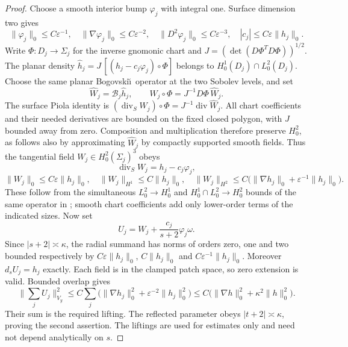 \documentclass[11pt,a4paper]{article}
\theoremstyle{remark}
\numberwithin{equation}{section}
\begin{document}
\begin{proof}
Choose a smooth interior bump $\varphi_j$ with integral one. Surface dimension
two gives
\[
 \|\varphi_j\|_0\le C\varepsilon^{-1},\quad
 \|\nabla\varphi_j\|_0\le C\varepsilon^{-2},\quad
 \|D^2\varphi_j\|_0\le C\varepsilon^{-3},\quad
 |c_j|\le C\varepsilon\|h_j\|_0.
\]
Write $\Phi:D_j\to\Sigma_j$ for the inverse gnomonic chart and
$J=(\det(D\Phi^TD\Phi))^{1/2}$. The planar density
$\widehat h_j=J\,[(h_j-c_j\varphi_j)\circ\Phi]$ belongs to
$H^1_0(D_j)\cap L^2_0(D_j)$. Choose the same planar Bogovski\u\i\ operator
at the two Sobolev levels, and set
\[
 \widehat W_j=\mathcal B_j\widehat h_j,\qquad
 W_j\circ\Phi=J^{-1}D\Phi\,\widehat W_j.
\]
The surface Piola identity is
$(\operatorname{div}_S W_j)\circ\Phi=J^{-1}\operatorname{div}\widehat W_j$.
All chart coefficients and their needed derivatives are bounded on the fixed
closed polygon, with $J$ bounded away from zero. Composition and multiplication
therefore preserve $H^2_0$, as follows also by approximating
$\widehat W_j$ by compactly supported smooth fields.
Thus the tangential field $W_j\in H^2_0(\Sigma_j)^3$ obeys
\[
 \operatorname{div}_SW_j=h_j-c_j\varphi_j,
\]
\[
 \|W_j\|_0\le C\varepsilon\|h_j\|_0,\quad
 \|W_j\|_{H^1}\le C\|h_j\|_0,\quad
 \|W_j\|_{H^2}\le
 C\bigl(\|\nabla h_j\|_0+\varepsilon^{-1}\|h_j\|_0\bigr).
\]
These follow from the simultaneous $L^2_0\to H^1_0$ and
$H^1_0\cap L^2_0\to H^2_0$ bounds of the same operator in \cite{CostabelMcIntosh2010};
smooth chart coefficients add only lower-order terms of the indicated sizes.
Now set
\[
 U_j=W_j+\frac{c_j}{s+2}\varphi_j\omega.
\]
Since $|s+2|\asymp\kappa$, the radial summand has norms of orders zero, one
and two bounded respectively by
$C\varepsilon\|h_j\|_0$, $C\|h_j\|_0$ and
$C\varepsilon^{-1}\|h_j\|_0$. Moreover $d_sU_j=h_j$ exactly. Each field is
in the clamped patch space, so zero extension is valid. Bounded overlap gives
\[
 \Big\|\sum_j U_j\Big\|_{V_y}^2
 \le C\sum_j\bigl(\|\nabla h_j\|_0^2+
                         \varepsilon^{-2}\|h_j\|_0^2\bigr)
 \le C\bigl(\|\nabla h\|_0^2+\kappa^2\|h\|_0^2\bigr).
\]
Their sum is the required lifting. The reflected parameter obeys
$|t+2|\asymp\kappa$, proving the second assertion. The liftings are used for
estimates only and need not depend analytically on $s$.
\end{proof}
\end{document}
